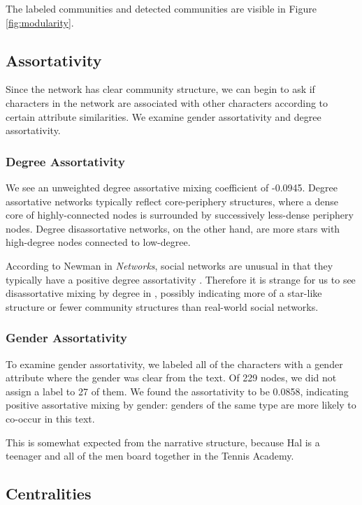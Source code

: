 The labeled communities and detected communities are visible in Figure \ref{fig:modularity}.

\subsection{Assortativity}
Since the network has clear community structure, we can begin to ask if characters in the network are associated with other characters according to certain attribute similarities. We examine gender assortativity and degree assortativity.

\subsubsection{Degree Assortativity}
We see an unweighted degree assortative mixing coefficient of -0.0945.
Degree assortative networks typically reflect core-periphery structures, where a dense core of highly-connected nodes is surrounded by successively less-dense periphery nodes. Degree disassortative networks, on the other hand, are more stars with high-degree nodes connected to low-degree. 

According to Newman in {\em Networks}, social networks are unusual in that they typically have a positive degree assortativity \cite{NewmanBook}. 
Therefore it is strange for us to see disassortative mixing by degree in \infinitejest, possibly indicating more of a star-like structure or fewer community structures than real-world social networks.

\subsubsection{Gender Assortativity}
To examine gender assortativity, we labeled all of the characters with a gender attribute where the gender was clear from the text. Of 229 nodes, we did not assign a label to 27 of them. We found the assortativity to be 0.0858, indicating positive assortative mixing by gender: genders of the same type are more likely to co-occur in this text. 

This is somewhat expected from the narrative structure, because Hal is a teenager and all of the men board together in the Tennis Academy.

\subsection{Centralities}

